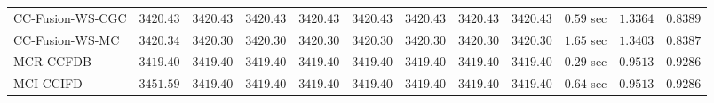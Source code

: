\begin{table}[H]
\begin{tabular}{lrrrrrrrrrrr}
    CC-Fusion-WS-CGC & $      3420.43$ & $      3420.43$ & $      3420.43$ & $      3420.43$ & $      3420.43$ & $      3420.43$ & $      3420.43$ & $      3420.43$ & $         0.59$ sec    & $       1.3364$  & $       0.8389$ \\ 
     CC-Fusion-WS-MC & $      3420.34$ & $      3420.30$ & $      3420.30$ & $      3420.30$ & $      3420.30$ & $      3420.30$ & $      3420.30$ & $      3420.30$ & $         1.65$ sec    & $       1.3403$  & $       0.8387$ \\ 
\cmidrule{1-1} 
           MCR-CCFDB & $      3419.40$ & $      3419.40$ & $      3419.40$ & $      3419.40$ & $      3419.40$ & $      3419.40$ & $      3419.40$ & $      3419.40$ & $         0.29$ sec    & $       0.9513$  & $       0.9286$ \\ 
\cmidrule{1-1} 
           MCI-CCIFD & $      3451.59$ & $      3419.40$ & $      3419.40$ & $      3419.40$ & $      3419.40$ & $      3419.40$ & $      3419.40$ & $      3419.40$ & $         0.64$ sec    & $       0.9513$  & $       0.9286$ \\ 
\bottomrule
\end{tabular}
\end{table}

